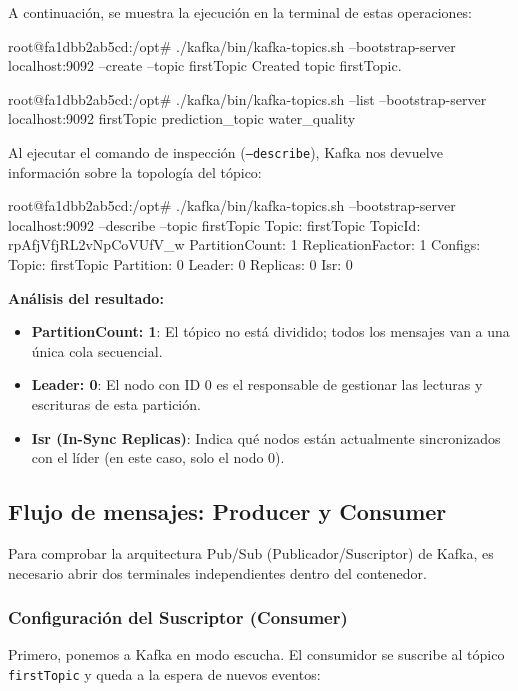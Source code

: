 \documentclass[
	a4paper, %
	12pt, %
]{CSSullivanBusinessReport}
\begin{document}
A continuación, se muestra la ejecución en la terminal de estas operaciones:

\begin{vscodeTerminal}
root@fa1dbb2ab5cd:/opt# ./kafka/bin/kafka-topics.sh --bootstrap-server localhost:9092 --create --topic firstTopic
Created topic firstTopic.

root@fa1dbb2ab5cd:/opt# ./kafka/bin/kafka-topics.sh --list --bootstrap-server localhost:9092
firstTopic
prediction_topic
water_quality
\end{vscodeTerminal}

Al ejecutar el comando de inspección (\texttt{--describe}), Kafka nos devuelve información  sobre la topología del tópico:

\begin{vscodeTerminal}
root@fa1dbb2ab5cd:/opt# ./kafka/bin/kafka-topics.sh --bootstrap-server localhost:9092 --describe --topic firstTopic
Topic: firstTopic    TopicId: rpAfjVfjRL2vNpCoVUfV_w PartitionCount: 1       ReplicationFactor: 1    Configs:
Topic: firstTopic       Partition: 0    Leader: 0       Replicas: 0     Isr: 0
\end{vscodeTerminal}

\textbf{Análisis del resultado:}
\begin{itemize}
\item \textbf{PartitionCount: 1}: El tópico no está dividido; todos los mensajes van a una única cola secuencial.
\item \textbf{Leader: 0}: El nodo con ID 0 es el responsable de gestionar las lecturas y escrituras de esta partición.
\item \textbf{Isr (In-Sync Replicas)}: Indica qué nodos están actualmente sincronizados con el líder (en este caso, solo el nodo 0).
\end{itemize}

\subsection{Flujo de mensajes: Producer y Consumer}

Para comprobar la arquitectura Pub/Sub (Publicador/Suscriptor) de Kafka, es necesario abrir dos terminales independientes dentro del contenedor.

\subsubsection{Configuración del Suscriptor (Consumer)}
Primero, ponemos a Kafka en modo escucha. El consumidor se suscribe al tópico \texttt{firstTopic} y queda a la espera de nuevos eventos:
\end{document}
